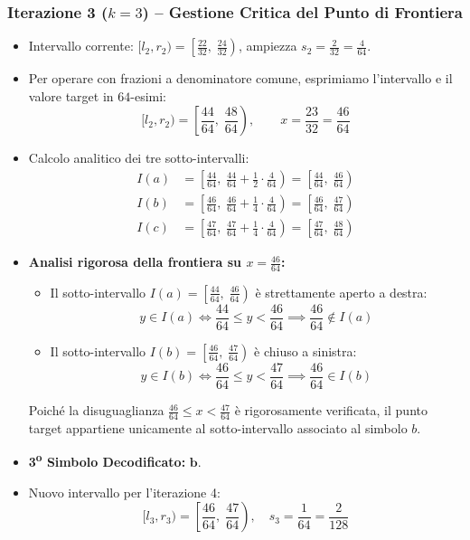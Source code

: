 \subsubsection*{Iterazione 3 ($k = 3$) -- Gestione Critica del Punto di Frontiera}
\label{subsec:iterazione-3-frontiera}
\begin{itemize}
  \item Intervallo corrente: $[l_2, r_2) = \left[ \frac{22}{32}, \; \frac{24}{32} \right)$, ampiezza $s_2 = \frac{2}{32} = \frac{4}{64}$.
  \item Per operare con frazioni a denominatore comune, esprimiamo l'intervallo e il valore target in $64$-esimi:
  \begin{equation}
    [l_2, r_2) = \left[ \frac{44}{64}, \; \frac{48}{64} \right), \qquad x = \frac{23}{32} = \frac{46}{64}
  \end{equation}
  \item Calcolo analitico dei tre sotto-intervalli:
  \begin{align}
    I(a) &= \left[ \frac{44}{64}, \; \frac{44}{64} + \frac{1}{2} \cdot \frac{4}{64} \right) = \left[ \frac{44}{64}, \; \frac{46}{64} \right) \\
    I(b) &= \left[ \frac{46}{64}, \; \frac{46}{64} + \frac{1}{4} \cdot \frac{4}{64} \right) = \left[ \frac{46}{64}, \; \frac{47}{64} \right) \\
    I(c) &= \left[ \frac{47}{64}, \; \frac{47}{64} + \frac{1}{4} \cdot \frac{4}{64} \right) = \left[ \frac{47}{64}, \; \frac{48}{64} \right)
  \end{align}
  \item \textbf{Analisi rigorosa della frontiera su $x = \frac{46}{64}$:}
  \begin{itemize}
    \item Il sotto-intervallo $I(a) = \left[ \frac{44}{64}, \; \frac{46}{64} \right)$ \`e strettamente aperto a destra:
    \begin{equation}
      y \in I(a) \iff \frac{44}{64} \le y < \frac{46}{64} \implies \frac{46}{64} \notin I(a)
    \end{equation}
    \item Il sotto-intervallo $I(b) = \left[ \frac{46}{64}, \; \frac{47}{64} \right)$ \`e chiuso a sinistra:
    \begin{equation}
      y \in I(b) \iff \frac{46}{64} \le y < \frac{47}{64} \implies \frac{46}{64} \in I(b)
    \end{equation}
  \end{itemize}
  Poich\'e la disuguaglianza $\frac{46}{64} \le x < \frac{47}{64}$ \`e rigorosamente verificata, il punto target appartiene unicamente al sotto-intervallo associato al simbolo $b$.
  \item \textbf{3\textsuperscript{o} Simbolo Decodificato:} $\mathbf{b}$.
  \item Nuovo intervallo per l'iterazione 4:
  \begin{equation}
    [l_3, r_3) = \left[ \frac{46}{64}, \; \frac{47}{64} \right), \quad s_3 = \frac{1}{64} = \frac{2}{128}
  \end{equation}
\end{itemize}

